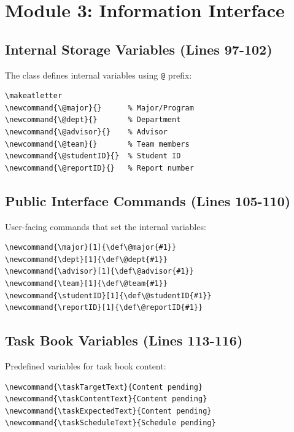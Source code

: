 \documentclass[linux]{hustreport}
\begin{document}
\newpage
\section{Module 3: Information Interface}

\subsection{Internal Storage Variables (Lines 97-102)}

The class defines internal variables using \verb|@| prefix:

\begin{verbatim}
\makeatletter
\newcommand{\@major}{}      % Major/Program
\newcommand{\@dept}{}       % Department
\newcommand{\@advisor}{}    % Advisor
\newcommand{\@team}{}       % Team members
\newcommand{\@studentID}{}  % Student ID
\newcommand{\@reportID}{}   % Report number
\end{verbatim}

\subsection{Public Interface Commands (Lines 105-110)}

User-facing commands that set the internal variables:

\begin{verbatim}
\newcommand{\major}[1]{\def\@major{#1}}
\newcommand{\dept}[1]{\def\@dept{#1}}
\newcommand{\advisor}[1]{\def\@advisor{#1}}
\newcommand{\team}[1]{\def\@team{#1}}
\newcommand{\studentID}[1]{\def\@studentID{#1}}
\newcommand{\reportID}[1]{\def\@reportID{#1}}
\end{verbatim}

\subsection{Task Book Variables (Lines 113-116)}

Predefined variables for task book content:

\begin{verbatim}
\newcommand{\taskTargetText}{Content pending}
\newcommand{\taskContentText}{Content pending}
\newcommand{\taskExpectedText}{Content pending}
\newcommand{\taskScheduleText}{Schedule pending}
\end{verbatim}
\end{document}
